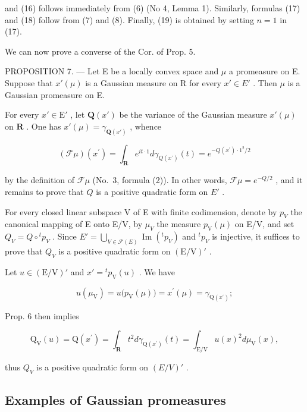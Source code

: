 and (16) follows immediately from (6) (No 4, Lemma 1). Similarly, formulas (17) and (18) follow from (7) and (8). Finally, (19) is obtained by setting \(n = 1\) in (17).

We can now prove a converse of the Cor. of Prop. 5.

PROPOSITION 7. --- Let E be a locally convex space and \(\mu\) a promeasure on E. Suppose that \(x'(\mu)\) is a Gaussian measure on R for every \(x' \in E'\) . Then \(\mu\) is a Gaussian promeasure on E.

For every \(x' \in \mathrm{E}'\) , let \(\mathbf{Q}(x')\) be the variance of the Gaussian measure \(x'(\mu)\) on \(\mathbf{R}\) . One has \(x'(\mu) = \gamma_{\mathbf{Q}(x')}\) , whence

\[
(\mathcal {F} \mu) (x ^ {\prime}) = \int_ {\mathbf {R}} e ^ {i t \cdot 1} d \gamma_ {Q (x ^ {\prime})} (t) = e ^ {- Q (x ^ {\prime}) \cdot 1 ^ {2} / 2}
\]

by the definition of \(\mathcal{F}\mu\) (No.~3, formula (2)). In other words, \(\mathcal{F}\mu = e^{-Q/2}\) , and it remains to prove that \(Q\) is a positive quadratic form on \(E'\) .

For every closed linear subspace V of E with finite codimension, denote by \(p_{V}\) the canonical mapping of E onto E/V, by \(\mu_{V}\) the measure \(p_{\mathrm{V}}(\mu)\) on E/V, and set \(Q_{V} = Q \circ {}^{t} p_{V}\) . Since \(E' = \bigcup_{V \in \mathcal{F}(E)} \operatorname{Im}({}^{t} p_{V})\) and \({}^{t} p_{V}\) is injective, it suffices to prove that \(Q_{V}\) is a positive quadratic form on \((\mathrm{E}/\mathrm{V})'\) .

Let \(u \in (\mathrm{E}/\mathrm{V})'\) and \(x' = {}^{t} p_{\mathrm{V}}(u)\) . We have

\[
u (\mu_ {\mathrm{V}}) = u \big (p _ {\mathrm{V}} (\mu) \big) = x ^ {\prime} (\mu) = \gamma_ {\mathrm{Q} (x ^ {\prime})};
\]

Prop. 6 then implies

\[
\mathrm{Q} _ {\mathrm{V}} (u) = \mathrm{Q} (x ^ {\prime}) = \int_ {\mathbf {R}} t ^ {2} d \gamma_ {\mathrm{Q} (x ^ {\prime})} (t) = \int_ {\mathrm{E} / \mathrm{V}} u (x) ^ {2} d \mu_ {\mathrm{V}} (x),
\]

thus \(Q_V\) is a positive quadratic form on \((E/V)'\) .

\subsection{Examples of Gaussian promeasures}

